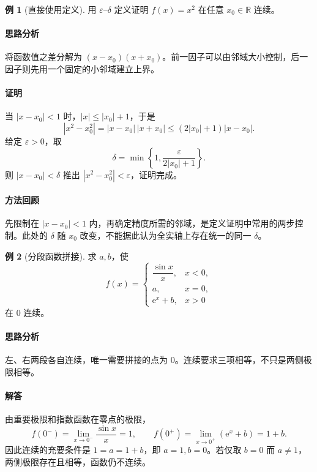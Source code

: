 \documentclass[UTF8,fontset=fandol,12pt,oneside,openany]{ctexrep}
\newcommand{\R}{\mathbb R}
\newcommand{\ee}{\mathrm e}
\theoremstyle{definition}
\newtheorem{example}{例}[chapter]
\begin{document}
\begin{example}[直接使用定义]
用 $\varepsilon$--$\delta$ 定义证明 $f(x)=x^2$ 在任意 $x_0\in\R$ 连续。
\end{example}
\paragraph{思路分析}
将函数值之差分解为 $(x-x_0)(x+x_0)$。前一因子可以由邻域大小控制，后一因子则先用一个固定的小邻域建立上界。
\paragraph{证明}
当 $|x-x_0|<1$ 时，$|x|\le |x_0|+1$，于是
\[
 |x^2-x_0^2|=|x-x_0|\,|x+x_0|
 \le(2|x_0|+1)|x-x_0|.
\]
给定 $\varepsilon>0$，取
\[
 \delta=\min\left\{1,\frac{\varepsilon}{2|x_0|+1}\right\}.
\]
则 $|x-x_0|<\delta$ 推出 $|x^2-x_0^2|<\varepsilon$，证明完成。
\paragraph{方法回顾}
先限制在 $|x-x_0|<1$ 内，再确定精度所需的邻域，是定义证明中常用的两步控制。此处的 $\delta$ 随 $x_0$ 改变，不能据此认为全实轴上存在统一的同一 $\delta$。

\begin{example}[分段函数拼接]
求 $a,b$，使
\[
 f(x)=\begin{cases}
 \dfrac{\sin x}{x},&x<0,\\
 a,&x=0,\\
 \ee^x+b,&x>0
 \end{cases}
\]
在 $0$ 连续。
\end{example}
\paragraph{思路分析}
左、右两段各自连续，唯一需要拼接的点为 $0$。连续要求三项相等，不只是两侧极限相等。
\paragraph{解答}
由重要极限和指数函数在零点的极限，
\[
 f(0^-)=\lim_{x\to0^-}\frac{\sin x}{x}=1,
 \qquad f(0^+)=\lim_{x\to0^+}(\ee^x+b)=1+b.
\]
因此连续的充要条件是 $1=a=1+b$，即 $a=1,b=0$。若仅取 $b=0$ 而 $a\ne1$，两侧极限存在且相等，函数仍不连续。
\end{document}
